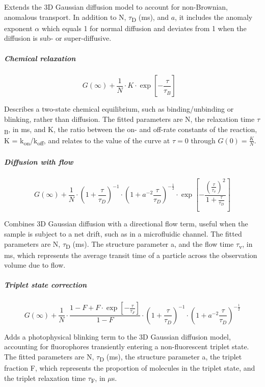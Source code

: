 \documentclass[
]{article}
\begin{document}
Extends the 3D Gaussian diffusion model to account for non-Brownian,
anomalous transport. In addition to N, $\tau$\textsubscript{D} (ms), and $a$,
it includes the anomaly exponent $\alpha$ which equals 1 for normal diffusion
and deviates from 1 when the diffusion is sub- or super-diffusive.

\hypertarget{chemical-relaxation}{%
\subparagraph{Chemical relaxation}\label{chemical-relaxation}}

\[\ \ \ \ G(\infty) + \frac{1}{N} \cdot K \cdot \exp\left\lbrack - \frac{\tau}{\tau_{B}} \right\rbrack\ \ \ \ \ \ \ \ \]

Describes a two-state chemical equilibrium, such as binding/unbinding or
blinking, rather than diffusion. The fitted parameters are N, the
relaxation time $\tau$\textsubscript{B}, in ms, and K, the ratio between the
on- and off-rate constants of the reaction, K =
k\textsubscript{on}/k\textsubscript{off}, and relates to the value of the curve at $\tau=0$ through $G(0) = \frac{K}{N}$.

\hypertarget{diffusion-with-flow}{%
\subparagraph{Diffusion with flow}\label{diffusion-with-flow}}

\[G(\infty) + \frac{1}{N} \cdot \left( 1 + \frac{\tau}{\tau_{D}} \right)^{- 1} \cdot \left( 1 + a^{- 2}\frac{\tau}{\tau_{D}} \right)^{- \frac{1}{2}} \cdot \exp\left\lbrack - \frac{\left( \frac{\tau}{\tau_{v}} \right)^{2}}{1 + \frac{\tau}{\tau_{D}}} \right\rbrack\]

Combines 3D Gaussian diffusion with a directional flow term, useful when
the sample is subject to a net drift, such as in a microfluidic channel.
The fitted parameters are N, $\tau$\textsubscript{D} (ms). The structure
parameter a, and the flow time $\tau$\textsubscript{v}, in ms, which
represents the average transit time of a particle across the observation
volume due to flow.

\hypertarget{triplet-state-correction}{%
\subparagraph{Triplet state
correction}\label{triplet-state-correction}}

\[G(\infty) + \frac{1}{N} \cdot \frac{1 - F + F \cdot \exp\left\lbrack - \frac{\tau}{\tau_{F}} \right\rbrack}{1 - F} \cdot \left( 1 + \frac{\tau}{\tau_{D}} \right)^{- 1} \cdot \left( 1 + a^{- 2}\frac{\tau}{\tau_{D}} \right)^{- \frac{1}{2}}\]

Adds a photophysical blinking term to the 3D Gaussian diffusion model,
accounting for fluorophores transiently entering a non-fluorescent
triplet state. The fitted parameters are N, $\tau$\textsubscript{D} (ms), the
structure parameter a, the triplet fraction F, which represents the
proportion of molecules in the triplet state, and the triplet relaxation
time $\tau$\textsubscript{F}, in $\mu$s.
\end{document}
